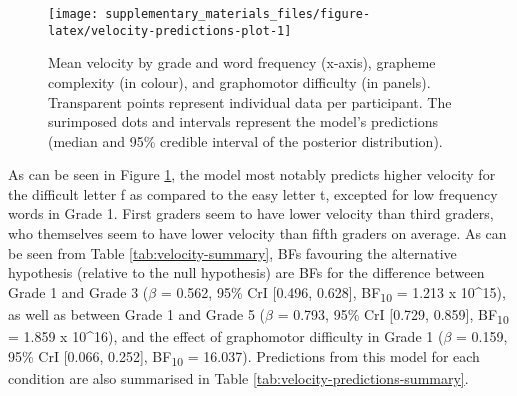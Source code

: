 \documentclass[
  11pt,
  english,
  ,doc,mask,floatsintext]{apa6}
\begin{document}
\begin{figure}[!htb]

{\centering \texttt{[image: supplementary\_materials\_files/figure-latex/velocity-predictions-plot-1]} 

}

\caption{Mean velocity by grade and word frequency (x-axis), grapheme complexity (in colour), and graphomotor difficulty (in panels). Transparent points represent individual data per participant. The surimposed dots and intervals represent the model's predictions (median and 95\% credible interval of the posterior distribution).}\label{fig:velocity-predictions-plot}
\end{figure}

As can be seen in Figure \ref{fig:velocity-predictions-plot}, the model most notably predicts higher velocity for the difficult letter f as compared to the easy letter t, excepted for low frequency words in Grade 1. First graders seem to have lower velocity than third graders, who themselves seem to have lower velocity than fifth graders on average. As can be seen from Table \ref{tab:velocity-summary}, BFs favouring the alternative hypothesis (relative to the null hypothesis) are BFs for the difference between Grade 1 and Grade 3 (\(\beta\) = 0.562, 95\% CrI {[}0.496, 0.628{]}, BF\textsubscript{10} = 1.213 x 10\^{}15), as well as between Grade 1 and Grade 5 (\(\beta\) = 0.793, 95\% CrI {[}0.729, 0.859{]}, BF\textsubscript{10} = 1.859 x 10\^{}16), and the effect of graphomotor difficulty in Grade 1 (\(\beta\) = 0.159, 95\% CrI {[}0.066, 0.252{]}, BF\textsubscript{10} = 16.037). Predictions from this model for each condition are also summarised in Table \ref{tab:velocity-predictions-summary}.
\end{document}
